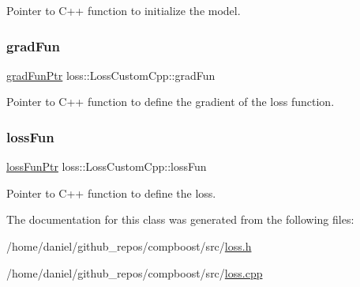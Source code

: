 Pointer to {\ttfamily C++} function to initialize the model. 

\mbox{\label{classloss_1_1_loss_custom_cpp_af5ff497278e6a271c8b26d737c87a219}} 
\subsubsection{\texorpdfstring{grad\+Fun}{gradFun}}
{\footnotesize\ttfamily \hyperlink{namespaceloss_acae0785d794ff7cc1b1242bab23f81c6}{grad\+Fun\+Ptr} loss\+::\+Loss\+Custom\+Cpp\+::grad\+Fun\hspace{0.3cm}{\ttfamily [private]}}



Pointer to {\ttfamily C++} function to define the gradient of the loss function. 

\mbox{\label{classloss_1_1_loss_custom_cpp_ad6f3e81f24f1ea5021d7bc7ab9a67d7a}} 
\subsubsection{\texorpdfstring{loss\+Fun}{lossFun}}
{\footnotesize\ttfamily \hyperlink{namespaceloss_a6658cb84c8687d6dd0904c00801542f3}{loss\+Fun\+Ptr} loss\+::\+Loss\+Custom\+Cpp\+::loss\+Fun\hspace{0.3cm}{\ttfamily [private]}}



Pointer to {\ttfamily C++} function to define the loss. 



The documentation for this class was generated from the following files\+:\begin{DoxyCompactItemize}
\item 
/home/daniel/github\+\_\+repos/compboost/src/\hyperlink{loss_8h}{loss.\+h}\item 
/home/daniel/github\+\_\+repos/compboost/src/\hyperlink{loss_8cpp}{loss.\+cpp}\end{DoxyCompactItemize}

